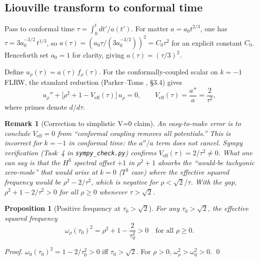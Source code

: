 \documentclass[12pt,letterpaper]{article}
\newtheorem{proposition}[theorem]{Proposition}
\newtheorem{remark}[theorem]{Remark}
\begin{document}
\subsection{Liouville transform to conformal time}

Pass to conformal time $\tau = \int_0^t dt'/a(t')$.
For matter $a = a_0 t^{2/3}$, one has $\tau = 3a_0^{-3/2}\,t^{1/3}$,
so $a(\tau) = (a_0\tau/(3a_0^{-3/2}))^2 = C_0\tau^2$ for an explicit
constant $C_0$.
Henceforth set $a_0=1$ for clarity, giving $a(\tau) = (\tau/3)^2$.

Define $u_\rho(\tau) = a(\tau)\,f_\rho(\tau)$.
For the conformally-coupled scalar on $k=-1$ FLRW,
the standard reduction (Parker--Toms \cite{ParkerToms09}, \S3.4) gives
\begin{equation}
  u_\rho'' + \bigl[\rho^2 + 1 - V_{\mathrm{eff}}(\tau)\bigr]\,u_\rho = 0,
  \qquad V_{\mathrm{eff}}(\tau) = \frac{a''}{a} = \frac{2}{\tau^2},
  \label{eq:modeconf}
\end{equation}
where primes denote $d/d\tau$.

\begin{remark}[Correction to simplistic V=0 claim]
An easy-to-make error is to conclude $V_{\mathrm{eff}} = 0$ from
``conformal coupling removes all potentials.''
This is \emph{incorrect} for $k=-1$ in conformal time:
the $a''/a$ term does \emph{not} cancel.
Sympy verification (Task~4 in \texttt{sympy\_check.py}) confirms
$V_{\mathrm{eff}}(\tau) = 2/\tau^2 \neq 0$.
What one can say is that the $H^3$ spectral offset $+1$ in
$\rho^2 + 1$ absorbs the ``would-be tachyonic zero-mode'' that
would arise at $k=0$ ($T^3$ case) where the effective squared
frequency would be $\rho^2 - 2/\tau^2$, which is negative for
$\rho < \sqrt{2}/\tau$.
With the gap, $\rho^2 + 1 - 2/\tau^2 > 0$ for all $\rho \geq 0$
whenever $\tau > \sqrt{2}$.
\end{remark}

\begin{proposition}[Positive frequency at $\tau_0 > \sqrt{2}$]
\label{prop:posfreq}
For any $\tau_0 > \sqrt{2}$, the effective squared frequency
\begin{equation}
  \omega_\rho(\tau_0)^2 = \rho^2 + 1 - \frac{2}{\tau_0^2} > 0
  \quad \text{for all } \rho \geq 0.
  \label{eq:posfreq}
\end{equation}
\end{proposition}
\begin{proof}
$\omega_0(\tau_0)^2 = 1 - 2/\tau_0^2 > 0$ iff $\tau_0 > \sqrt{2}$.
For $\rho > 0$, $\omega_\rho^2 > \omega_0^2 > 0$.
\qed
\end{proof}
\end{document}
